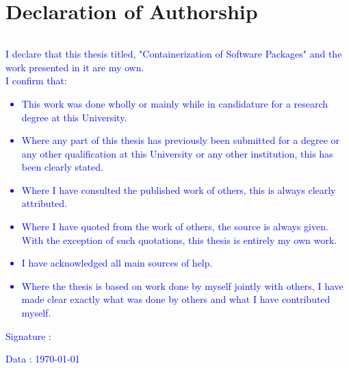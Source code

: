 \section*{ Declaration of Authorship  }
\thispagestyle{empty}

\begin{verbatim}

\end{verbatim}
\noindent 
\textcolor{blue}{
I declare that this thesis titled, "Containerization of Software Packages" and the work
presented in it are my own.\\ I confirm that:
\begin{itemize}
\item This work was done wholly or mainly while in candidature for a research degree at this University.
\item Where any part of this thesis has previously been submitted for a degree or any other qualification at this University or any other institution, this has been clearly stated.
\item Where I have consulted the published work of others, this is always
clearly attributed.
\item Where I have quoted from the work of others, the source is always
given. With the exception of such quotations, this thesis is entirely
my own work.
\item I have acknowledged all main sources of help.
\item  Where the thesis is based on work done by myself jointly with others,
I have made clear exactly what was done by others and what I have
contributed myself.
\end{itemize}
}

\begin{flushleft}
\textcolor{blue}{Signature :}

\end{flushleft}

 
\begin{flushright}
\textcolor{blue}{Data :  \today}

\end{flushright} 
 
